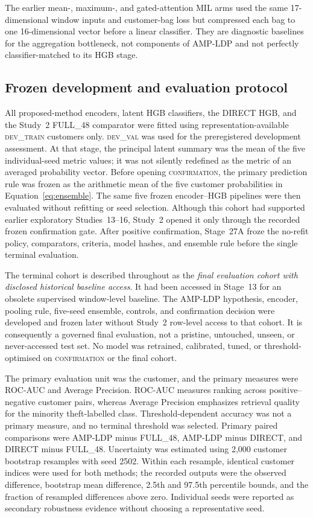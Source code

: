 The earlier mean-, maximum-, and gated-attention MIL arms used the same 17-dimensional window inputs and customer-bag loss but compressed each bag to one 16-dimensional vector before a linear classifier. They are diagnostic baselines for the aggregation bottleneck, not components of AMP-LDP and not perfectly classifier-matched to its HGB stage.

\subsection{Frozen development and evaluation protocol}

All proposed-method encoders, latent HGB classifiers, the DIRECT HGB, and the Study~2 FULL\_48 comparator were fitted using representation-available \textsc{dev\_train} customers only. \textsc{dev\_val} was used for the preregistered development assessment. At that stage, the principal latent summary was the mean of the five individual-seed metric values; it was not silently redefined as the metric of an averaged probability vector. Before opening \textsc{confirmation}, the primary prediction rule was frozen as the arithmetic mean of the five customer probabilities in Equation~\ref{eq:ensemble}. The same five frozen encoder--HGB pipelines were then evaluated without refitting or seed selection. Although this cohort had supported earlier exploratory Studies~13--16, Study~2 opened it only through the recorded frozen confirmation gate. After positive confirmation, Stage~27A froze the no-refit policy, comparators, criteria, model hashes, and ensemble rule before the single terminal evaluation.

The terminal cohort is described throughout as the \emph{final evaluation cohort with disclosed historical baseline access}. It had been accessed in Stage~13 for an obsolete supervised window-level baseline. The AMP-LDP hypothesis, encoder, pooling rule, five-seed ensemble, controls, and confirmation decision were developed and frozen later without Study~2 row-level access to that cohort. It is consequently a governed final evaluation, not a pristine, untouched, unseen, or never-accessed test set. No model was retrained, calibrated, tuned, or threshold-optimised on \textsc{confirmation} or the final cohort.

The primary evaluation unit was the customer, and the primary measures were ROC-AUC and Average Precision. ROC-AUC measures ranking across positive--negative customer pairs, whereas Average Precision emphasizes retrieval quality for the minority theft-labelled class. Threshold-dependent accuracy was not a primary measure, and no terminal threshold was selected. Primary paired comparisons were AMP-LDP minus FULL\_48, AMP-LDP minus DIRECT, and DIRECT minus FULL\_48. Uncertainty was estimated using 2,000 customer bootstrap resamples with seed 2502. Within each resample, identical customer indices were used for both methods; the recorded outputs were the observed difference, bootstrap mean difference, 2.5th and 97.5th percentile bounds, and the fraction of resampled differences above zero. Individual seeds were reported as secondary robustness evidence without choosing a representative seed.

